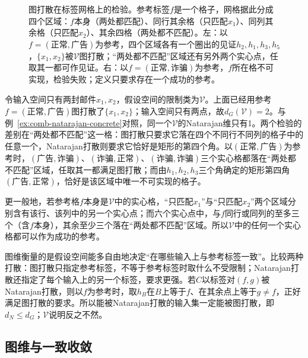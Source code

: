 \begin{figure}[htbp]
  \centering
  
  \caption{图打散在标签网格上的检验。参考标签$f$是一个格子，网格据此分成四个区域：$f$本身（两处都匹配）、同行其余格（只匹配$x_1$）、同列其余格（只匹配$x_2$）、其余四格（两处都不匹配）。左：以$f=(\text{正常},\text{广告})$为参考，四个区域各有一个圈出的见证$h_2,h_1,h_3,h_5$，$\{x_1,x_2\}$被$\mathcal V$图打散；“两处都不匹配”区域还有另外两个实心点，任取其一都可作见证。右：以$f=(\text{正常},\text{诈骗})$为参考，$f$所在格不可实现，检验失败；定义只要求存在一个成功的参考。}
  \label{fig:graph-shattering-concrete}
  \label{fig:lt6-graph-shattering-grid}
\end{figure}

\begin{example}
\label{ex:comb-graph-shattering-concrete}
令输入空间只有两封邮件$x_1,x_2$，假设空间的限制类为$\mathcal V$。上面已经用参考$f=(\text{正常},\text{广告})$图打散了$\{x_1,x_2\}$；输入空间只有两点，故$d_G(\mathcal V)=2$。与例~\ref{ex:comb-natarajan-concrete}对照，同一个$\mathcal V$的Natarajan维只有1。两个检验的差别在“两处都不匹配”这一格：图打散只要求它落在四个不同行不同列的格子中的任意一个，Natarajan打散则要求它恰好是矩形的第四个角。以$(\text{正常},\text{广告})$为参考时，$(\text{广告},\text{诈骗})$、$(\text{诈骗},\text{正常})$、$(\text{诈骗},\text{诈骗})$三个实心格都落在“两处都不匹配”区域，任取其一都满足图打散；而由$h_1,h_2,h_3$三个角确定的矩形第四角$(\text{广告},\text{正常})$，恰好是该区域中唯一不可实现的格子。

更一般地，若参考格$f$本身是$\mathcal V$中的实心格，“只匹配$x_1$”与“只匹配$x_2$”两个区域分别含有该行、该列中的另一个实心点；而六个实心点中，与$f$同行或同列的至多三个（含$f$本身），其余至少三个落在“两处都不匹配”区域。所以$\mathcal V$中的任何一个实心格都可以作为成功的参考。
\end{example}

图维衡量的是假设空间能多自由地决定“在哪些输入上与参考标签一致”。比较两种打散：图打散只指定参考标签，不等于参考标签时取什么不受限制；Natarajan打散还指定了每个输入上的另一个标签，要求更强。若$C$以标签对$(f,g)$被Natarajan打散，则以$f$为参考时，取$h_B$在$B$上等于$f$、在其余点上等于$g\neq f$，正好满足图打散的要求。所以能被Natarajan打散的输入集一定能被图打散，即$d_N\leq d_G$；$\mathcal V$说明反之不然。

\subsection{图维与一致收敛}
\label{sec:lt6-graph-uniform-convergence}

